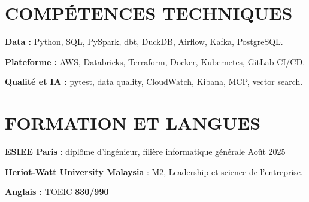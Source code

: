 \documentclass[a4paper,11pt]{article}
\begin{document}
\section*{COMPÉTENCES TECHNIQUES}
\textbf{Data :} Python, SQL, PySpark, dbt, DuckDB, Airflow, Kafka, PostgreSQL.\par
\vspace{2pt}
\textbf{Plateforme :} AWS, Databricks, Terraform, Docker, Kubernetes, GitLab CI/CD.\par
\vspace{2pt}
\textbf{Qualité et IA :} pytest, data quality, CloudWatch, Kibana, MCP, vector search.

\section*{FORMATION ET LANGUES}
\textbf{ESIEE Paris} : diplôme d'ingénieur, filière informatique générale \hfill {\small\color{muted}Août 2025}\par
\vspace{3pt}
\textbf{Heriot-Watt University Malaysia} : M2, Leadership et science de l'entreprise.\par
\vspace{3pt}
\textbf{Anglais :} TOEIC \textbf{830/990}
\end{document}
